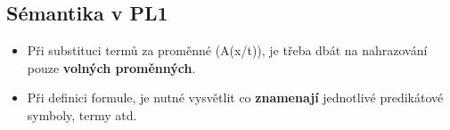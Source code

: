 \subsection{Sémantika v PL1}
\begin{itemize}
\item Při substituci termů za proměnné (A(x/t)), je třeba dbát na nahrazování pouze \textbf{volných proměnných}.
\item Při definici formule, je nutné vysvětlit co \textbf{znamenají} jednotlivé predikátové symboly, termy atd.
\end{itemize}

